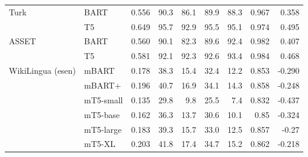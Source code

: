 \documentclass[11pt,a4paper]{article}
\begin{document}
\begin{table*}[!htbp]
\begin{tabular}{@{}llrrrrrrr@{}}
\midrule
\multirow{2}{*}{Turk} & \small{BART} & 0.556 & 90.3 & 86.1 & 89.9 & 88.3 & 0.967 & 0.358 \\
 & \small{T5} & 0.649 & 95.7 & 92.9 & 95.5 & 95.1 & 0.974 & 0.495 \\
\midrule
\multirow{2}{*}{ASSET} & \small{BART} & 0.560 & 90.1 & 82.3 & 89.6 & 92.4 & 0.982 & 0.407 \\
 & \small{T5} & 0.581 & 92.1 & 92.3 & 92.6 & 93.4 & 0.984 & 0.468 \\
\midrule
\multirow{2}{*}{WikiLingua (esen)} & \small{mBART} & 0.178 & 38.3 & 15.4 & 32.4 & 12.2 & 0.853 & -0.290 \\
 & \small{mBART+} & 0.196 & 40.7 & 16.9 & 34.1 & 14.3 & 0.858 & -0.248 \\
 & \small{mT5-small} & 0.135 & 29.8 & 9.8 & 25.5 & 7.4 & 0.832 & -0.437 \\
& \small{mT5-base} & 0.162 & 36.3 & 13.7 & 30.6 & 10.1 & 0.85 & -0.324 \\
& \small{mT5-large} & 0.183 & 39.3 & 15.7 & 33.0 & 12.5 & 0.857 & -0.27 \\
& \small{mT5-XL} & 0.203 & 41.8 & 17.4 & 34.7 & 15.2 & 0.862 & -0.218 \\


\end{tabular}
\end{table*}
\end{document}
